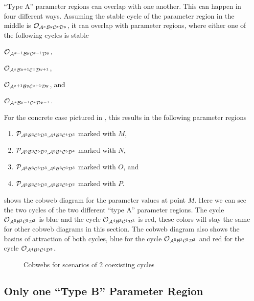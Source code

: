 ``Type A'' parameter regions can overlap with one another.
This can happen in four different ways.
Assuming the stable cycle of the parameter region in the middle is $\mathcal{O}_{\mathcal{A}^x\mathcal{B}^y\mathcal{C}^x\mathcal{D}^y}$, it can overlap with parameter regions, where either one of the following cycles is stable
\begin{enumerate*}
	\item $\mathcal{O}_{\mathcal{A}^{x-1}\mathcal{B}^y\mathcal{C}^{x-1}\mathcal{D}^y}$,
	\item $\mathcal{O}_{\mathcal{A}^x\mathcal{B}^{y+1}\mathcal{C}^x\mathcal{D}^{y+1}}$,
	\item $\mathcal{O}_{\mathcal{A}^{x+1}\mathcal{B}^y\mathcal{C}^{x+1}\mathcal{D}^y}$, and
	\item $\mathcal{O}_{\mathcal{A}^x\mathcal{B}^{y-1}\mathcal{C}^x\mathcal{D}^{y-1}}$.
\end{enumerate*}
For the concrete case pictured in , this results in the following parameter regions
\begin{enumerate}
	\item $\mathcal{P}_{\mathcal{A}^5\mathcal{B}^3\mathcal{C}^5\mathcal{D}^3, \mathcal{A}^4\mathcal{B}^3\mathcal{C}^4\mathcal{D}^3}$ marked with $M$,
	\item $\mathcal{P}_{\mathcal{A}^5\mathcal{B}^3\mathcal{C}^5\mathcal{D}^3, \mathcal{A}^5\mathcal{B}^4\mathcal{C}^5\mathcal{D}^4}$ marked with $N$,
	\item $\mathcal{P}_{\mathcal{A}^5\mathcal{B}^3\mathcal{C}^5\mathcal{D}^3, \mathcal{A}^6\mathcal{B}^3\mathcal{C}^6\mathcal{D}^3}$ marked with $O$, and
	\item $\mathcal{P}_{\mathcal{A}^5\mathcal{B}^3\mathcal{C}^5\mathcal{D}^3, \mathcal{A}^5\mathcal{B}^2\mathcal{C}^5\mathcal{D}^2}$ marked with $P$.
\end{enumerate}
 shows the cobweb diagram for the parameter values at point $M$.
Here we can see the two cycles of the two different ``type A'' parameter regions.
The cycle $\mathcal{O}_{\mathcal{A}^5\mathcal{B}^3\mathcal{C}^5\mathcal{D}^3}$ is blue and the cycle $\mathcal{O}_{\mathcal{A}^4\mathcal{B}^3\mathcal{C}^4\mathcal{D}^3}$ is red, these colors will stay the same for other cobweb diagrams in this section.
The cobweb diagram also shows the basins of attraction of both cycles, blue for the cycle $\mathcal{O}_{\mathcal{A}^5\mathcal{B}^3\mathcal{C}^5\mathcal{D}^3}$ and red for the cycle $\mathcal{O}_{\mathcal{A}^4\mathcal{B}^3\mathcal{C}^4\mathcal{D}^3}$.

\begin{figure}
	\centering
	\caption{Cobwebs for scenarios of 2 coexisting cycles}
\end{figure}

\subsection{Only one ``Type B'' Parameter Region}

